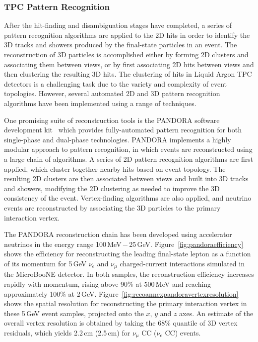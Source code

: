\subsubsection{TPC Pattern Recognition}

After the hit-finding and disambiguation stages have completed, a series of 
pattern recognition algorithms are applied to the 2D hits in order to identify 
the 3D tracks and showers produced by the final-state particles in an event.
The reconstruction of 3D particles is accomplished either by forming 2D clusters
and associating them between views, or by first associating 2D hits between views
and then clustering the resulting 3D hits. 
The clustering of hits in Liquid Argon TPC detectors is a challenging task
due to the variety and complexity of event topologies.
However, several automated 2D and 3D pattern recognition algorithms have been 
implemented using a range of techniques.

One promising suite of reconstruction tools is the 
PANDORA software development kit~\cite{Marshall:2013bda,Marshall:2012hh}
which provides fully-automated pattern recognition for both single-phase 
and dual-phase technologies. 
PANDORA implements a highly modular approach to pattern recognition,
in which events are reconstructed using a large chain of algorithms. 
A series of 2D pattern recognition algorithms are first applied,
which cluster together nearby hits based on event topology.
The resulting 2D clusters are then associated between views
and built into 3D tracks and showers, modifying the 2D clustering 
as needed to improve the 3D consistency of the event. 
Vertex-finding algorithms are also applied,
and neutrino events are reconstructed by associating the 
3D particles to the primary interaction vertex.

The PANDORA reconstruction chain has been developed using accelerator neutrinos 
in the energy range 100\,MeV\,$-$\,25\,GeV.
Figure~\ref{fig:pandoraefficiency} shows the efficiency for reconstructing
the leading final-state lepton as a function of its momentum
for 5\,GeV $\nu_{e}$ and $\nu_{\mu}$ charged-current interactions
simulated in the MicroBooNE detector.
In both samples, the reconstruction efficiency increases rapidly with momentum,
rising above 90\% at 500\,MeV and reaching approximately 100\% at 2\,GeV.
Figure~\ref{fig:recoannexpandoravertexresolution} shows the spatial resolution for
reconstructing the primary interaction vertex in these 5\,GeV event samples,
projected onto the $x$, $y$ and $z$ axes. An estimate of the overall vertex 
resolution is obtained by taking the 68\% quantile of 3D vertex residuals, 
which yields 2.2\,cm (2.5\,cm) for $\nu_{\mu}$ CC ($\nu_{e}$ CC) events.

